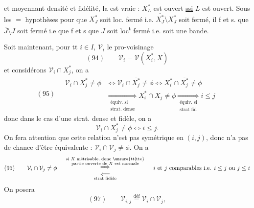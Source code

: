 
et moyennant densité et fidélité, la   est vraie : $X_L^*$ est ouvert \uline{ssi} $L$ est ouvert. Sous les $=$ hypothèses pour que $X_J^*$ soit loc. fermé i.e. $\overline{X_J^*}\setminus X_J^*$  soit fermé,  il f et s. que $\bar J\setminus J$ soit fermé i.e que f et s que $J$ soit loc\textsuperscript{t} fermé i.e. soit une bande.

Soit maintenant, pour tt $i\in I$, $\mathcal V_i$ le pro-voisinage
\[(94)\qquad\mathcal V_i=\mathcal V(X_i^*,X)\]
et considérons $\mathcal V_i\cap X_j^*$, on a
\[
(95)\quad\begin{aligned}
\mathcal V_i\cap X_j^*\neq\phi&\Longleftrightarrow\mathcal V_i\cap\overline{X_j^*}\neq\phi\Longleftrightarrow X_i^*\cap\overline{X_j^*}\neq\phi\\
&\underset{\substack{\text{équiv. si}\\\text{strat. dense}}}{\Longrightarrow}X_i^*\cap X_j\neq\phi\underset{\substack{\text{équiv. si}\\\text{strat fid}}}{\Longrightarrow}i\leq j
\end{aligned}
\]
donc dans le cas d'une strat. dense et fidèle,  on a
\[\mathcal V_i\cap X_j^*\neq\phi\Longleftrightarrow i\leq j.\]
On fera attention que cette relation n'est pas symétrique en $(i,j)$,  donc n'a pas de chance d'être équivalente : $\mathcal V_i\cap\mathcal V_j\neq\phi$. On a
\[
(95)\qquad\mathcal V_i\cap\mathcal V_j\neq\phi\quad
\begin{array}{c}
\overset{\substack{\text{si $X$ métrisable, donc \unsure{tt|tte}}\\\text{partie ouverte de $X$ est normale}}}{\Longrightarrow}\\
\underset{\text{strat fidèle}}{\Longleftarrow}
\end{array}
\quad\text{$i$ et $j$ comparables i.e. $i\leq j$ ou $j\leq i$}
\]
On posera
\[(97)\qquad\mathcal V_{i,j}\overset{\mathrm{déf}}=\mathcal V_i\cap\mathcal V_j,\]
